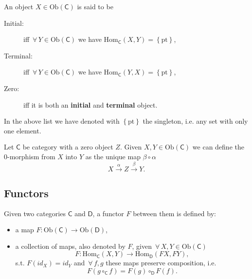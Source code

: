 \begin{defn}
	An object $X \in \mathrm{Ob} \left(\mathsf{C}\right)$ is said to be
	\begin{description}
		\item[Initial:] iff $\,\forall\, Y \in \mathrm{Ob} \left(\mathsf{C}\right)$ we have $\mathrm{Hom}_{\mathsf{C}} \left( X, Y \right) = \left\{ \mathrm{pt} \right\}$,
		\item[Terminal:] iff $\,\forall\, Y \in \mathrm{Ob} \left(\mathsf{C}\right)$ we have $\mathrm{Hom}_{\mathsf{C}} \left( Y, X \right) = \left\{ \mathrm{pt} \right\}$,
		\item[Zero:] iff it is both an \textbf{initial} and \textbf{terminal} object.
	\end{description} 
	In the above list we have denoted with $\left\{ \mathrm{pt} \right\}$ the singleton, i.e. any set with only one element.
\end{defn}

\begin{defn}
	Let $\mathsf{C}$ be category with a zero object $Z$.
	Given $X, Y \in \mathrm{Ob} \left(\mathsf{C}\right)$ we can define the $0$-morphism from $X$ into $Y$ as the unique map $\beta \circ \alpha$
	\begin{equation}
	X \xrightarrow{\alpha} Z \xrightarrow{\beta} Y
	.\end{equation} 
\end{defn}

\subsection{Functors}

\begin{defn}[Functor]
	Given two categories $\mathsf{C}$ and $\mathsf{D}$, a functor $F$ between them is defined by:
	\begin{itemize}
		\item a map $F: \mathrm{Ob} \left(\mathsf{C}\right) \to \mathrm{Ob} \left(\mathsf{D}\right)$,
		\item a collection of maps, also denoted by $F$, given $\,\forall\, X,Y \in \mathrm{Ob} \left(\mathsf{C}\right)$
			\begin{equation}
			F: \mathrm{Hom}_{\mathsf{C}} \left( X, Y \right) \to \mathrm{Hom}_{\mathsf{D}} \left( FX, FY \right) 
			,\end{equation} 
			s.t. $F(id_X) = id_Y$ and $\,\forall\, f,g$ these maps preserve composition, i.e. 
			\begin{equation}
			 F \left( g \circ_{\mathsf{C}} f \right) = F(g) \circ_{\mathsf{D}} F(f)
			.\end{equation}
	\end{itemize}
\end{defn}

